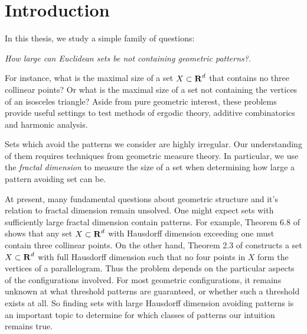 
\chapter{Introduction}
\label{ch:Introduction}

In this thesis, we study a simple family of questions:
%
\begin{center}
	{\it How large can Euclidean sets be not containing geometric patterns?}.
\end{center}
%
For instance, what is the maximal size of a set $X \subset \operatorname{\mathbf{R}}^d$ that contains no three collinear points? Or what is the maximal size of a set not containing the vertices of an isosceles triangle? Aside from pure geometric interest, these problems provide useful settings to test methods of ergodic theory, additive combinatorics and harmonic analysis.

Sets which avoid the patterns we consider are highly irregular. Our understanding of them requires techniques from geometric measure theory. In particular, we use the \emph{fractal dimension} to measure the size of a set when determining how large a pattern avoiding set can be.



At present, many fundamental questions about geometric structure and it's relation to fractal dimension remain unsolved. One might expect sets with sufficiently large fractal dimension contain patterns. For example, Theorem 6.8 of \cite{Matilla} shows that any set $X \subset \operatorname{\mathbf{R}}^d$ with Hausdorff dimension exceeding one must contain three collinear points. On the other hand, Theorem 2.3 of \cite{Maga} constructs a set $X \subset \operatorname{\mathbf{R}}^d$ with full Hausdorff dimension such that no four points in $X$ form the vertices of a parallelogram. Thus the problem depends on the particular aspects of the configurations involved. For most geometric configurations, it remains unknown at what threshold patterns are guaranteed, or whether such a threshold exists at all. So finding sets with large Hausdorff dimension avoiding patterns is an important topic to determine for which classes of patterns our intuition remains true.

